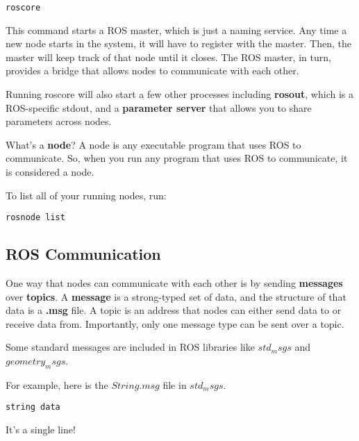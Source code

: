 \begin{tcolorbox}
\begin{lstlisting}
roscore
\end{lstlisting}
\end{tcolorbox}

This command starts a ROS master, which is just a naming service. Any time a new node starts in the system, it will have to register with the master. Then, the master will keep track of that node until it closes. The ROS master, in turn, provides a bridge that allows nodes to communicate with each other.

Running roscore will also start a few other processes including \textbf{rosout}, which is a ROS-specific stdout, and a \textbf{parameter server} that allows you to share parameters across nodes.   

What's a \textbf{node}? A node is any executable program that uses ROS to communicate. So, when you run any program that uses ROS to communicate, it is considered a node.

To list all of your running nodes, run:

\begin{tcolorbox}
\begin{lstlisting}
rosnode list
\end{lstlisting}
\end{tcolorbox}

\subsection{ROS Communication}
One way that nodes can communicate with each other is by sending \textbf{messages} over \textbf{topics}. A \textbf{message} is a strong-typed set of data, and the structure of that data is a \textbf{.msg} file. A topic is an address that nodes can either send data to or receive data from. Importantly, only one message type can be sent over a topic. 

Some standard messages are included in ROS libraries like $std_msgs$ and $geometry_msgs$.

For example, here is the $String.msg$ file in $std_msgs$.

\begin{tcolorbox}
\begin{lstlisting}
string data
\end{lstlisting}
\end{tcolorbox}

It's a single line!

